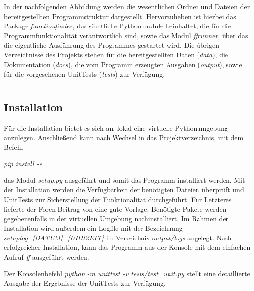 In der nachfolgenden Abbildung werden die wesentlichen Ordner und Dateien der bereitgestellten Programmstruktur dargestellt. Hervorzuheben ist hierbei das Package \emph{functionfinder}, das sämtliche Pythonmodule beinhaltet, die für die Programmfunktionalität verantwortlich sind, sowie das Modul \emph{ffrunner}, über das die eigentliche Ausführung des Programmes gestartet wird.
Die übrigen Verzeichnisse des Projekts stehen für die bereitgestellten Daten (\emph{data}), die Dokumentation (\emph{docs}), die vom Programm erzeugten Ausgaben (\emph{output}), sowie für die vorgesehenen UnitTests (\emph{tests}) zur Verfügung.

	
\begin{tabular}{c}  %

\end{tabular}

\subsection{Installation}

Für die Installation bietet es sich an, lokal eine virtuelle Pythonumgebung anzulegen. Anschließend kann nach Wechsel in das Projektverzeichnis, mit dem Befehl
\begin{center}\emph{pip install -e .}\end{center}
das Modul \emph{setup.py} ausgeführt und somit das Programm installiert werden. Mit der Installation werden die Verfügbarkeit der benötigten Dateien überprüft und UnitTests zur Sicherstellung der Funktionalität durchgeführt. Für Letzteres lieferte der Foren-Beitrag von \cite{jesuisme_answer_2021} eine gute Vorlage. Benötigte Pakete werden gegebenenfalls in der virtuellen Umgebung nachinstalliert. Im Rahmen der Installation wird außerdem ein Logfile mit der Bezeichnung \emph{setuplog\_[DATUM]\_[UHRZEIT]} im Verzeichnis \emph{output/logs} angelegt. Nach erfolgreicher Installation, kann das Programm aus der Konsole mit dem einfachen Aufruf \emph{\glqq ff\grqq} ausgeführt werden.

Der Konsolenbefehl \emph{python -m unittest -v tests/test\_unit.py} stellt eine detaillierte Ausgabe der Ergebnisse der UnitTests zur Verfügung. 

